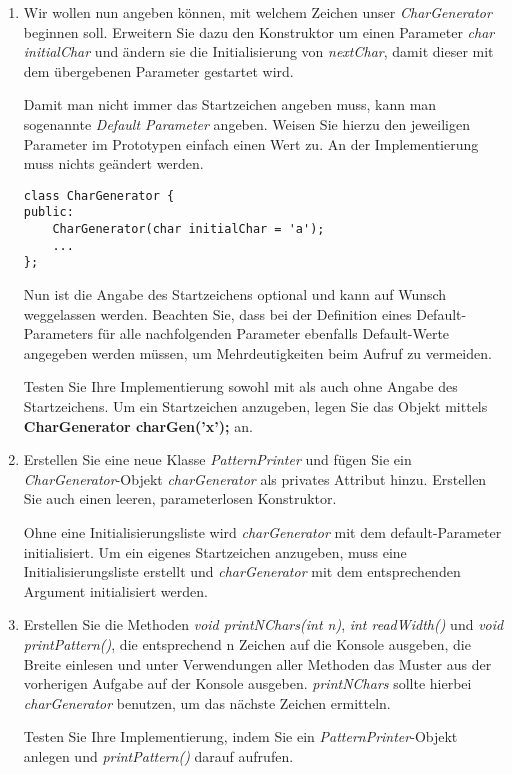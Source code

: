 \documentclass[
  accentcolor=tud1c,	%
  colorbacktitle,		%
  inverttitle,			%
  german,				%
  twoside
]{tudexercise}
\begin{document}
\begin{enumerate}
\item Wir wollen nun angeben können, mit welchem Zeichen unser \emph{CharGenerator} beginnen soll. Erweitern Sie dazu den Konstruktor um einen Parameter \emph{char initialChar} und ändern sie die Initialisierung von \emph{nextChar}, damit dieser mit dem übergebenen Parameter gestartet wird.

Damit man nicht immer das Startzeichen angeben muss, kann man sogenannte \emph{Default Parameter} angeben. Weisen Sie hierzu den jeweiligen Parameter im Prototypen einfach einen Wert zu. An der Implementierung muss nichts geändert werden.
\begin{lstlisting}
class CharGenerator {
public:
	CharGenerator(char initialChar = 'a');
	...
};
\end{lstlisting}

Nun ist die Angabe des Startzeichens optional und kann auf Wunsch weggelassen werden. Beachten Sie, dass bei der Definition eines Default-Parameters für alle nachfolgenden Parameter ebenfalls Default-Werte angegeben werden müssen, um Mehrdeutigkeiten beim Aufruf zu vermeiden. 

Testen Sie Ihre Implementierung sowohl mit als auch ohne Angabe des Startzeichens. Um ein Startzeichen anzugeben, legen Sie das Objekt mittels \textbf{CharGenerator charGen('x');} an.

\item Erstellen Sie eine neue Klasse \emph{PatternPrinter} und fügen Sie ein \emph{CharGenerator}-Objekt \emph{charGenerator} als privates Attribut hinzu. Erstellen Sie auch einen leeren, parameterlosen Konstruktor.

Ohne eine Initialisierungsliste wird \emph{charGenerator} mit dem default-Parameter initialisiert. Um ein eigenes Startzeichen anzugeben, muss eine Initialisierungsliste erstellt und \emph{charGenerator} mit dem entsprechenden Argument initialisiert werden.

\item Erstellen Sie die Methoden \emph{void printNChars(int n)}, \emph{int readWidth()} und \emph{void printPattern()}, die entsprechend n Zeichen auf die Konsole ausgeben, die Breite einlesen und unter Verwendungen aller Methoden das Muster aus der vorherigen Aufgabe auf der Konsole ausgeben. \emph{printNChars} sollte hierbei \emph{charGenerator} benutzen, um das nächste Zeichen ermitteln.

Testen Sie Ihre Implementierung, indem Sie ein \emph{PatternPrinter}-Objekt anlegen und \emph{printPattern()} darauf aufrufen.

\end{enumerate}
\end{document}
